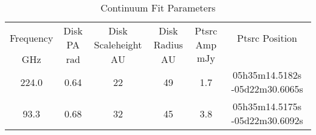 \begin{table*}[htp]
\centering
\caption{Continuum Fit Parameters}
\begin{tabular}{cccccc}
\label{tab:continuum_fit_parameters}
Frequency & Disk PA & Disk Scaleheight & Disk Radius & Ptsrc Amp & Ptsrc Position \\
$\mathrm{GHz}$ & $\mathrm{rad}$ & $\mathrm{AU}$ & $\mathrm{AU}$ & $\mathrm{mJy}$ &  \\
\hline
224.0 & 0.64 & 22 & 49 & 1.7 & 05h35m14.5182s -05d22m30.6065s \\
93.3 & 0.68 & 32 & 45 & 3.8 & 05h35m14.5175s -05d22m30.6092s \\
\hline
\end{tabular}
\end{table*}
